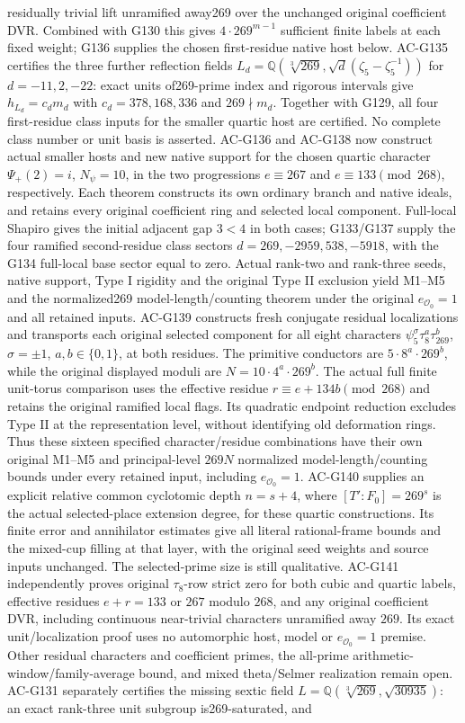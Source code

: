 \documentclass[11pt,a4paper]{article}
\theoremstyle{definition}
\theoremstyle{remark}
\begin{document}
residually trivial lift unramified away269 over the unchanged original coefficient DVR. Combined with G130 this gives $4\cdot269^{m-1}$ sufficient finite labels at each fixed weight; G136 supplies the chosen first-residue native host below. AC-G135 certifies the three further reflection fields $L_d=\mathbb Q(\sqrt[3]{269},\sqrt d(\zeta_5-\zeta_5^{-1}))$ for $d=-11,2,-22$: exact units of269-prime index and rigorous intervals give $h_{L_d}=c_dm_d$ with $c_d=378,168,336$ and $269\nmid m_d$. Together with G129, all four first-residue class inputs for the smaller quartic host are certified. No complete class number or unit basis is asserted. AC-G136 and AC-G138 now construct actual smaller hosts and new native support for the chosen quartic character $\Psi_+(2)=i$, $N_\psi=10$, in the two progressions $e\equiv267$ and $e\equiv133\pmod{268}$, respectively. Each theorem constructs its own ordinary branch and native ideals, and retains every original coefficient ring and selected local component. Full-local Shapiro gives the initial adjacent gap $3<4$ in both cases; G133/G137 supply the four ramified second-residue class sectors $d=269,-2959,538,-5918$, with the G134 full-local base sector equal to zero. Actual rank-two and rank-three seeds, native support, Type I rigidity and the original Type II exclusion yield M1--M5 and the normalized269 model-length/counting theorem under the original $e_{\mathcal O_0}=1$ and all retained inputs. AC-G139 constructs fresh conjugate residual localizations and transports each original selected component for all eight characters $\psi_5^\sigma\tau_8^a\tau_{269}^b$, $\sigma=\pm1$, $a,b\in\{0,1\}$, at both residues. The primitive conductors are $5\cdot8^a\cdot269^b$, while the original displayed moduli are $N=10\cdot4^a\cdot269^b$. The actual full finite unit-torus comparison uses the effective residue $r\equiv e+134b\pmod{268}$ and retains the original ramified local flags. Its quadratic endpoint reduction excludes Type II at the representation level, without identifying old deformation rings. Thus these sixteen specified character/residue combinations have their own original M1--M5 and principal-level $269N$ normalized model-length/counting bounds under every retained input, including $e_{\mathcal O_0}=1$. AC-G140 supplies an explicit relative common cyclotomic depth $n=s+4$, where $[T':F_0]=269^s$ is the actual selected-place extension degree, for these quartic constructions. Its finite error and annihilator estimates give all literal rational-frame bounds and the mixed-cup filling at that layer, with the original seed weights and source inputs unchanged. The selected-prime size is still qualitative. AC-G141 independently proves original $\tau_8$-row strict zero for both cubic and quartic labels, effective residues $e+r=133$ or $267$ modulo $268$, and any original coefficient DVR, including continuous near-trivial characters unramified away $269$. Its exact unit/localization proof uses no automorphic host, model or $e_{\mathcal O_0}=1$ premise. Other residual characters and coefficient primes, the all-prime arithmetic-window/family-average bound, and mixed theta/Selmer realization remain open. AC-G131 separately certifies the missing sextic field $L=\mathbb Q(\sqrt[3]{269},\sqrt{30935})$: an exact rank-three unit subgroup is269-saturated, and 
\end{document}
